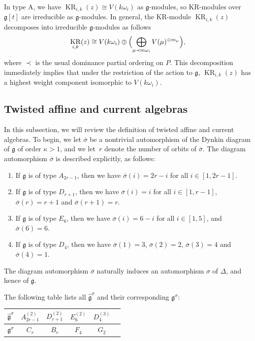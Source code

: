 \documentclass[10pt,a4paper]{amsart}
\numberwithin{equation}{section}
\DeclareMathOperator{\KR}{KR}
\begin{document}
In type A, we have $\KR_{i,k}(z)\cong V(k\omega_i)$ as $\mathfrak{g}$-modules, so KR-modules over $\mathfrak{g}[t]$ are irreducible as $\mathfrak{g}$-modules. In general, the KR-module $\KR_{i,k}(z)$ decomposes into irreducible $\mathfrak{g}$-modules as follows \cite{Chari01}
\[
\KR_{i,k}(z)\cong V(k\omega_i)\oplus\Bigl(\bigoplus_{\mu\prec m\omega_i}V(\mu)^{\oplus m_{\mu}}\Bigr),
\]
where $\prec$ is the usual dominance partial ordering on $P$. This decomposition immediately implies that under the restriction of the action to $\mathfrak{g}$, $\KR_{i,k}(z)$ has a highest weight component isomorphic to $V(k\omega_i)$.

\subsection{Twisted affine and current algebras}\label{Section 2.4}

In this subsection, we will review the definition of twisted affine and current algebras. To begin, we let $\overline{\sigma}$ be a nontrivial automorphism of the Dynkin diagram of $\mathfrak{g}$ of order $\kappa>1$, and we let~$r$ denote the number of orbits of $\overline{\sigma}$. The diagram automorphism $\overline{\sigma}$ is described explicitly, as follows:{\samepage
\begin{enumerate}\itemsep=0pt
\item[(1)] If $\mathfrak{g}$ is of type $A_{2r-1}$, then we have $\overline{\sigma}(i)=2r-i$ for all $i\in[1,2r-1]$.
\item[(2)] If $\mathfrak{g}$ is of type $D_{r+1}$, then we have $\overline{\sigma}(i)=i$ for all $i\in[1,r-1]$, $\overline{\sigma}(r)=r+1$ and $\overline{\sigma}(r+1)=r$.
\item[(3)] If $\mathfrak{g}$ is of type $E_6$, then we have $\overline{\sigma}(i)=6-i$ for all $i\in[1,5]$, and $\overline{\sigma}(6)=6$.
\item[(4)] If $\mathfrak{g}$ is of type $D_4$, then we have $\overline{\sigma}(1)=3$, $\overline{\sigma}(2)=2$, $\overline{\sigma}(3)=4$ and $\overline{\sigma}(4)=1$.
\end{enumerate}
The diagram automorphism $\overline{\sigma}$ naturally induces an automorphism $\sigma$ of $\Delta$, and hence of $\mathfrak{g}$.}

{\samepage The following table lists all $\widehat{\mathfrak{g}}^{\sigma}$ and their corresponding $\mathfrak{g}^{\sigma}$:
\begin{center}\renewcommand{\arraystretch}{1.2}
 \begin{tabular}{|c|c|c|c|c|c|}
 \hline
 $\widehat{\mathfrak{g}}^{\sigma}$ & $A_{2r-1}^{(2)}$ & $D_{r+1}^{(2)}$ & $E_{6}^{(2)}$ & $D_4^{(3)}$ \\ \hline
 $\mathfrak{g}^{\sigma}$ & $C_r$ & $B_r$ & $F_4$ & $G_2$ \\
 \hline
 \end{tabular}
\end{center}

}
\end{document}
